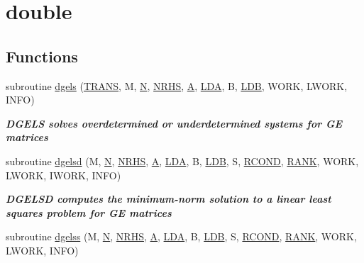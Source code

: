 \hypertarget{group__doubleGEsolve}{}\section{double}
\label{group__doubleGEsolve}
\subsection*{Functions}
\begin{DoxyCompactItemize}
\item 
subroutine \hyperlink{group__doubleGEsolve_ga225c8efde208eaf246882df48e590eac}{dgels} (\hyperlink{superlu__enum__consts_8h_a0c4e17b2d5cea33f9991ccc6a6678d62a1f61e3015bfe0f0c2c3fda4c5a0cdf58}{T\+R\+A\+N\+S}, M, \hyperlink{polmisc_8c_a0240ac851181b84ac374872dc5434ee4}{N}, \hyperlink{example__user_8c_aa0138da002ce2a90360df2f521eb3198}{N\+R\+H\+S}, \hyperlink{classA}{A}, \hyperlink{example__user_8c_ae946da542ce0db94dced19b2ecefd1aa}{L\+D\+A}, B, \hyperlink{example__user_8c_a50e90a7104df172b5a89a06c47fcca04}{L\+D\+B}, W\+O\+R\+K, L\+W\+O\+R\+K, I\+N\+F\+O)
\begin{DoxyCompactList}\small\item\em {\bfseries  D\+G\+E\+L\+S solves overdetermined or underdetermined systems for G\+E matrices} \end{DoxyCompactList}\item 
subroutine \hyperlink{group__doubleGEsolve_ga94bd4a63a6dacf523e25ff617719f752}{dgelsd} (M, \hyperlink{polmisc_8c_a0240ac851181b84ac374872dc5434ee4}{N}, \hyperlink{example__user_8c_aa0138da002ce2a90360df2f521eb3198}{N\+R\+H\+S}, \hyperlink{classA}{A}, \hyperlink{example__user_8c_ae946da542ce0db94dced19b2ecefd1aa}{L\+D\+A}, B, \hyperlink{example__user_8c_a50e90a7104df172b5a89a06c47fcca04}{L\+D\+B}, S, \hyperlink{superlu__enum__consts_8h_af00a42ecad444bbda75cde1b64bd7e72a9b5c151728d8512307565994c89919d5}{R\+C\+O\+N\+D}, \hyperlink{splinemodule_8c_a3a88bcc63386de30443dacede2e01847}{R\+A\+N\+K}, W\+O\+R\+K, L\+W\+O\+R\+K, I\+W\+O\+R\+K, I\+N\+F\+O)
\begin{DoxyCompactList}\small\item\em {\bfseries  D\+G\+E\+L\+S\+D computes the minimum-\/norm solution to a linear least squares problem for G\+E matrices} \end{DoxyCompactList}\item 
subroutine \hyperlink{group__doubleGEsolve_gaa6ed601d0622edcecb90de08d7a218ec}{dgelss} (M, \hyperlink{polmisc_8c_a0240ac851181b84ac374872dc5434ee4}{N}, \hyperlink{example__user_8c_aa0138da002ce2a90360df2f521eb3198}{N\+R\+H\+S}, \hyperlink{classA}{A}, \hyperlink{example__user_8c_ae946da542ce0db94dced19b2ecefd1aa}{L\+D\+A}, B, \hyperlink{example__user_8c_a50e90a7104df172b5a89a06c47fcca04}{L\+D\+B}, S, \hyperlink{superlu__enum__consts_8h_af00a42ecad444bbda75cde1b64bd7e72a9b5c151728d8512307565994c89919d5}{R\+C\+O\+N\+D}, \hyperlink{splinemodule_8c_a3a88bcc63386de30443dacede2e01847}{R\+A\+N\+K}, W\+O\+R\+K, L\+W\+O\+R\+K, I\+N\+F\+O)

\end{DoxyCompactItemize}
